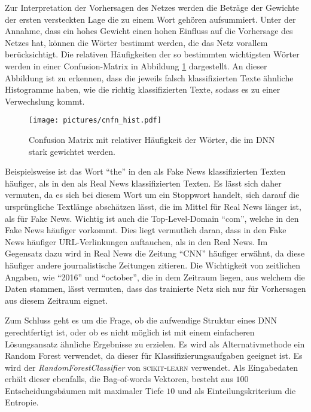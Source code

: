 Zur Interpretation der Vorhersagen des Netzes werden die Beträge der Gewichte der ersten versteckten Lage
die zu einem Wort gehören aufsummiert. Unter der Annahme, dass ein hohes Gewicht einen 
hohen Einfluss auf die Vorhersage des Netzes hat, können die Wörter bestimmt werden,
die das Netz vorallem berücksichtigt. Die relativen Häufigkeiten der so bestimmten wichtigsten 
Wörter werden in einer Confusion-Matrix in Abbildung \ref{fig:cnfn_hist} dargestellt. An dieser 
Abbildung ist zu erkennen, dass die jeweils falsch klassifizierten Texte ähnliche Histogramme haben,
wie die richtig klassifizierten Texte, sodass es zu einer Verwechslung kommt. 

\begin{figure}
    \centering
    \texttt{[image: pictures/cnfn\_hist.pdf]}
    \caption{Confusion Matrix mit relativer Häufigkeit der Wörter, die 
    im DNN stark gewichtet werden.}
    \label{fig:cnfn_hist}
\end{figure}

Beispielsweise ist das Wort \enquote{the} in den als Fake News klassifizierten Texten häufiger, als in den als 
Real News klassifizierten Texten. Es lässt sich daher vermuten, da es sich bei diesem Wort um 
ein Stoppwort handelt, sich darauf die ursprüngliche Textlänge abschätzen lässt, die im Mittel
für Real News länger ist, als für Fake News. Wichtig ist auch die Top-Level-Domain \enquote{com},
welche in den Fake News häufiger vorkommt. Dies liegt vermutlich daran, dass in den Fake News 
häufiger URL-Verlinkungen auftauchen, als in den Real News. Im Gegensatz dazu wird in Real News 
die Zeitung \enquote{CNN} häufiger erwähnt, da diese häufiger andere journalistische 
Zeitungen zitieren. Die Wichtigkeit von zeitlichen Angaben, wie \enquote{2016} und \enquote{october},
die in dem Zeitraum liegen, aus welchem die Daten stammen, lässt vermuten, dass das trainierte 
Netz sich nur für Vorhersagen aus diesem Zeitraum eignet.

Zum Schluss geht es um die Frage, ob die aufwendige Struktur eines DNN gerechtfertigt ist, oder 
ob es nicht möglich ist mit einem einfacheren Lösungsansatz ähnliche Ergebnisse zu erzielen. Es 
wird als Alternativmethode ein Random Forest verwendet, da dieser für Klassifizierungsaufgaben 
geeignet ist. Es wird der \textit{RandomForestClassifier} von \textsc{scikit-learn} verwendet.
Als Eingabedaten erhält dieser ebenfalls, die Bag-of-words Vektoren, besteht 
aus $100$ Entscheidungsbäumen mit maximaler Tiefe $10$ und als Einteilungskriterium die Entropie.

